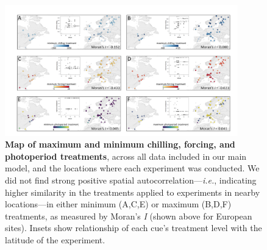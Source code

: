 \documentclass{article}
\begin{document}
\begin{figure}[h!]
\centering
\noindent \includegraphics[width=0.9\textwidth]{..//..//analyses/bb_analysis/figures/minmaxtreatmentsmap_corr.png}
\caption{\textbf{Map of maximum and minimum chilling, forcing, and photoperiod treatments}, across all data included in our main model, and the locations where each experiment was conducted. We did not find strong positive spatial autocorrelation---\emph{i.e.}, indicating higher similarity in the treatments applied to experiments in nearby locations---in either minimum (A,C,E) or maximum (B,D,F) treatments, as measured by Moran's \emph{I} (shown above for European sites). Insets show relationship of each cue's treatment level with the latitude of the experiment.}
\label{fig:trtmap}
\end{figure}
\end{document}
